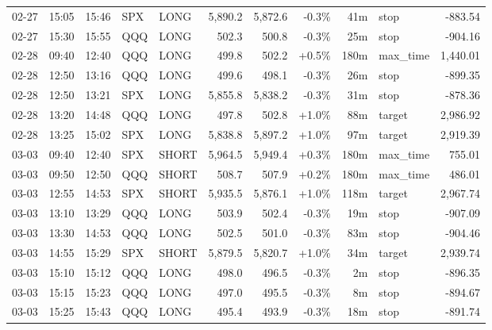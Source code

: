 \documentclass[11pt,a4paper,twoside]{article}
\begin{document}
\begin{center}
\begin{longtable}{>{\color{txtmain}}l l l l l r r r r >{\color{txtmain}}l r}
02-27 & 15:05 & 15:46 & SPX & LONG & 5,890.2 & 5,872.6 & \textcolor{lossred}{-0.3\%} & 41m & stop & \textcolor{lossred}{-883.54} \\
02-27 & 15:30 & 15:55 & QQQ & LONG & 502.3 & 500.8 & \textcolor{lossred}{-0.3\%} & 25m & stop & \textcolor{lossred}{-904.16} \\
02-28 & 09:40 & 12:40 & QQQ & LONG & 499.8 & 502.2 & \textcolor{wingreen}{+0.5\%} & 180m & max\_time & \textcolor{wingreen}{1,440.01} \\
02-28 & 12:50 & 13:16 & QQQ & LONG & 499.6 & 498.1 & \textcolor{lossred}{-0.3\%} & 26m & stop & \textcolor{lossred}{-899.35} \\
02-28 & 12:50 & 13:21 & SPX & LONG & 5,855.8 & 5,838.2 & \textcolor{lossred}{-0.3\%} & 31m & stop & \textcolor{lossred}{-878.36} \\
02-28 & 13:20 & 14:48 & QQQ & LONG & 497.8 & 502.8 & \textcolor{wingreen}{+1.0\%} & 88m & target & \textcolor{wingreen}{2,986.92} \\
02-28 & 13:25 & 15:02 & SPX & LONG & 5,838.8 & 5,897.2 & \textcolor{wingreen}{+1.0\%} & 97m & target & \textcolor{wingreen}{2,919.39} \\
03-03 & 09:40 & 12:40 & SPX & SHORT & 5,964.5 & 5,949.4 & \textcolor{wingreen}{+0.3\%} & 180m & max\_time & \textcolor{wingreen}{755.01} \\
03-03 & 09:50 & 12:50 & QQQ & SHORT & 508.7 & 507.9 & \textcolor{wingreen}{+0.2\%} & 180m & max\_time & \textcolor{wingreen}{486.01} \\
03-03 & 12:55 & 14:53 & SPX & SHORT & 5,935.5 & 5,876.1 & \textcolor{wingreen}{+1.0\%} & 118m & target & \textcolor{wingreen}{2,967.74} \\
03-03 & 13:10 & 13:29 & QQQ & LONG & 503.9 & 502.4 & \textcolor{lossred}{-0.3\%} & 19m & stop & \textcolor{lossred}{-907.09} \\
03-03 & 13:30 & 14:53 & QQQ & LONG & 502.5 & 501.0 & \textcolor{lossred}{-0.3\%} & 83m & stop & \textcolor{lossred}{-904.46} \\
03-03 & 14:55 & 15:29 & SPX & SHORT & 5,879.5 & 5,820.7 & \textcolor{wingreen}{+1.0\%} & 34m & target & \textcolor{wingreen}{2,939.74} \\
03-03 & 15:10 & 15:12 & QQQ & LONG & 498.0 & 496.5 & \textcolor{lossred}{-0.3\%} & 2m & stop & \textcolor{lossred}{-896.35} \\
03-03 & 15:15 & 15:23 & QQQ & LONG & 497.0 & 495.5 & \textcolor{lossred}{-0.3\%} & 8m & stop & \textcolor{lossred}{-894.67} \\
03-03 & 15:25 & 15:43 & QQQ & LONG & 495.4 & 493.9 & \textcolor{lossred}{-0.3\%} & 18m & stop & \textcolor{lossred}{-891.74} \\

\end{longtable}
\end{center}
\end{document}
